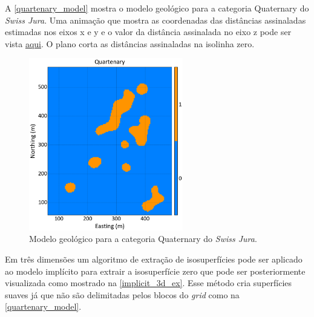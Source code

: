 A \autoref{quartenary_model} mostra o modelo geológico para a categoria Quaternary do \textit{Swiss Jura}. Uma animação que mostra as coordenadas das distâncias assinaladas estimadas nos eixos x e y e o valor da distância assinalada no eixo z pode ser vista \href{https://github.com/robertorolo/assessing_geological_model_uncertainty_with_probability_fields/blob/main/anim_onecat.gif}{aqui}. O plano corta as distâncias assinaladas na isolinha zero. 

\begin{figure}[H]
	\centering
	\caption{\label{quartenary_model}Modelo geológico para a categoria Quaternary do \textit{Swiss Jura}.}
	\includegraphics[width=0.6\textwidth]{capitulo_2/imagens/geomodel_quaternary.png}
\end{figure}

Em três dimensões um algoritmo de extração de isosuperfícies pode ser aplicado ao modelo implícito para extrair a isosuperfície zero que pode ser posteriormente visualizada como mostrado na \autoref{implicit_3d_ex}. Esse método cria superfícies suaves já que não são delimitadas pelos blocos do \textit{grid} como na \autoref{quartenary_model}. 


